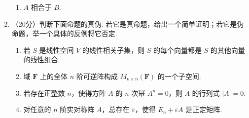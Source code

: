 \begin{enumerate}
\begin{enumerate}
        \item $A$ 相合于 $B$.
    \end{enumerate}

    \item （20分）判断下面命题的真伪. 若它是真命题，给出一个简单证明；若它是伪命题，举一个具体的反例将它否定.
    \begin{enumerate}
        \item 若 $S$ 是线性空间 $V$ 的线性相关子集，则 $S$ 的每个向量都是 $S$ 的其他向量的线性组合.

        \item 域 $\mathbf{F}$ 上的全体 $n$ 阶可逆阵构成 $M_{n\times n}(\mathbf{F})$ 的一个子空间.

        \item 若存在正整数 $n$，使得方阵 $A$ 的 $n$ 次幂 $A^n=0$，则 $A$ 的行列式 $\lvert A \rvert = 0$.

        \item 对任意的 $n$ 阶实对称阵 $A$，总存在 $\varepsilon$，使得 $E_n+\varepsilon A$ 是正定矩阵.
    \end{enumerate}
\end{enumerate}

\clearpage
